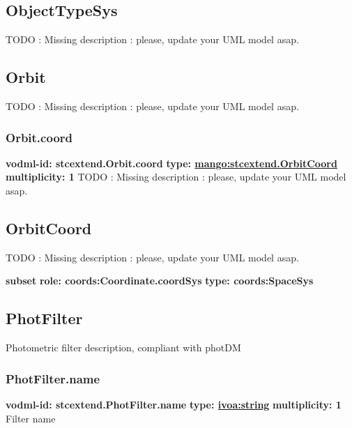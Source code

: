   \subsection{ObjectTypeSys}
  \label{sect:stcextend.ObjectTypeSys}
    TODO : Missing description : please, update your UML model asap.

  \subsection{Orbit}
  \label{sect:stcextend.Orbit}
    TODO : Missing description : please, update your UML model asap.

    \subsubsection{Orbit.coord}
      \textbf{vodml-id: stcextend.Orbit.coord} \newline
      \textbf{type: \hyperref[sect:stcextend.OrbitCoord]{mango:stcextend.OrbitCoord}} \newline
      \textbf{multiplicity: 1} \newline 
      TODO : Missing description : please, update your UML model asap.

  \subsection{OrbitCoord}
  \label{sect:stcextend.OrbitCoord}
    TODO : Missing description : please, update your UML model asap.

    \noindent \textbf{subset} \newline
    \indent   \textbf{role: coords:Coordinate.coordSys} \newline
    \indent   \textbf{type: coords:SpaceSys} \newline


  \subsection{PhotFilter}
  \label{sect:stcextend.PhotFilter}
    Photometric filter description, compliant with photDM

    \subsubsection{PhotFilter.name}
      \textbf{vodml-id: stcextend.PhotFilter.name} \newline
      \textbf{type: \hyperref[sect:ivoa]{ivoa:string}} \newline
      \textbf{multiplicity: 1} \newline 
      Filter name

